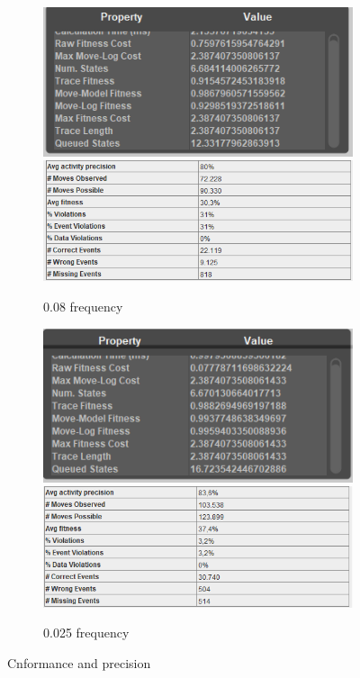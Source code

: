 \begin{figure}[!htbp]
\centering
\begin{subfigure}{0.4\textwidth}
  \centering
  \includegraphics[width=\linewidth]{P_Conformance0-08.PNG}
  \includegraphics[width=1\linewidth]{P_Precision0-08.PNG}
  \caption{0.08 frequency}
  \label{fig:P_0-08}
\end{subfigure}
\begin{subfigure}{0.4\textwidth}
  \centering
  \includegraphics[width=1\linewidth]{P_Conformance0-025.PNG}
  \includegraphics[width=\linewidth]{P_Precision0-025.PNG}
  \caption{0.025 frequency}
  \label{fig:P_0-025}
\end{subfigure}
\caption{Cnformance and precision}
\label{fig:P_Direct2}
\end{figure}

